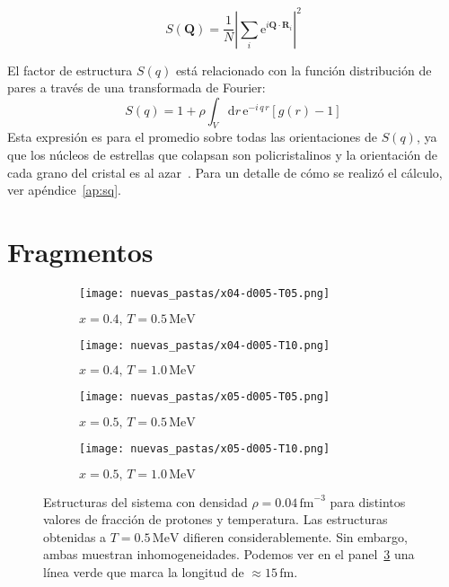 \begin{equation*}
  S(\mathbf{Q}) = \frac{1}{N} |\sum_i \text{e}^{i\mathbf{Q}\cdot\mathbf{R}_i}|^2
\end{equation*}

El factor de estructura $S(q)$ está relacionado con la función distribución de pares a través de una transformada de Fourier:
\begin{equation}
S(q) = 1 + \rho \int_V{\text{d}r\, \text{e}^{-i\,q\,r} \left[g(r) - 1\right]}
\end{equation}
Esta expresión es para el promedio sobre todas las orientaciones de $S(q)$, ya que los núcleos de estrellas que colapsan son policristalinos y la orientación de cada grano del cristal es al azar~\cite{sonoda_impact_2007}.
Para un detalle de cómo se realizó el cálculo, ver apéndice~\ref{ap:sq}.

\section{Fragmentos}\label{sc:clusters}

\begin{figure}[h!]  \centering
  \begin{subfigure}[h!]{0.40\columnwidth}
    \texttt{[image: nuevas\_pastas/x04-d005-T05.png]}
    \caption{$x=0.4,\, T=0.5\,\text{MeV}$}
    \label{subfig:04-05}
  \end{subfigure}
  \begin{subfigure}[h!]{0.40\columnwidth}
    \texttt{[image: nuevas\_pastas/x04-d005-T10.png]}
    \caption{$x=0.4,\, T=1.0\,\text{MeV}$}
    \label{subfig:04-10}
  \end{subfigure}
  \begin{subfigure}[h!]{0.40\columnwidth}
    \texttt{[image: nuevas\_pastas/x05-d005-T05.png]}
    \caption{$x=0.5,\, T=0.5\,\text{MeV}$}
    \label{subfig:05-05}
  \end{subfigure}
  \begin{subfigure}[h!]{0.40\columnwidth}
    \texttt{[image: nuevas\_pastas/x05-d005-T10.png]}
    \caption{$x=0.5,\, T=1.0\,\text{MeV}$}
    \label{subfig:05-10}
  \end{subfigure}
  \caption{Estructuras del sistema con densidad $\rho = 0.04\,\text{fm}^{-3}$ para distintos valores de fracción de protones y temperatura.
    Las estructuras obtenidas a $T=0.5\,\text{MeV}$ difieren considerablemente.
    Sin embargo, ambas muestran inhomogeneidades.
    Podemos ver en el panel~\ref{subfig:05-05} una línea verde que marca la longitud de $\approx 15\,\text{fm}$.}
  \label{fig:morpho}
\end{figure}


